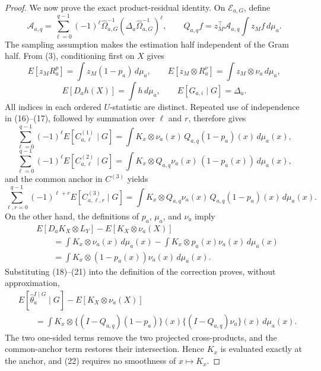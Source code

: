 \documentclass{article}
\begin{document}
\begin{proof}
We now prove the exact product-residual identity.  On \(\mathcal E_{a,G}\), define
\[
 \mathcal A_{a,q}
 =\sum_{\ell=0}^{q-1}(-1)^\ell
 \widehat\Omega_{a,G}^{-1}
 (\Delta_a\widehat\Omega_{a,G}^{-1})^\ell,
 \qquad
 Q_{a,q}f
 =z_M^\top\mathcal A_{a,q}\int z_Mf\,d\mu_a.
 \tag{15}
\]
The sampling assumption makes the estimation half independent of the Gram half.  From (3), conditioning first on \(X\) gives
\[
 E[z_MR_a^p]
 =\int z_M(1-p_a)\,d\mu_a,
 \qquad
 E[z_M\otimes R_a^\nu]
 =\int z_M\otimes\nu_a\,d\mu_a,
 \tag{16}
\]
\[
 E[D_ah(X)]=\int h\,d\mu_a,
 \qquad
 E[G_{a,i}\mid G]=\Delta_a.
 \tag{17}
\]
All indices in each ordered \(U\)-statistic are distinct.  Repeated use of independence in (16)--(17), followed by summation over \(\ell\) and \(r\), therefore gives
\[
 \sum_{\ell=0}^{q-1}(-1)^\ell
 E[C^{(1)}_{a,\ell}\mid G]
 =\int K_x\otimes\nu_a(x)\,
        Q_{a,q}(1-p_a)(x)\,d\mu_a(x),
 \tag{18}
\]
\[
 \sum_{\ell=0}^{q-1}(-1)^\ell
 E[C^{(2)}_{a,\ell}\mid G]
 =\int K_x\otimes Q_{a,q}\nu_a(x)\,
        (1-p_a(x))\,d\mu_a(x),
 \tag{19}
\]
and the common anchor in \(C^{(3)}\) yields
\[
 \sum_{\ell,r=0}^{q-1}(-1)^{\ell+r}
 E[C^{(3)}_{a,\ell,r}\mid G]
 =\int K_x\otimes Q_{a,q}\nu_a(x)\,
        Q_{a,q}(1-p_a)(x)\,d\mu_a(x).
 \tag{20}
\]
On the other hand, the definitions of \(p_a\), \(\mu_a\), and \(\nu_a\) imply
\[
 \begin{aligned}
 &E[D_aK_X\otimes L_Y]
   -E[K_X\otimes\nu_a(X)]\\
 &\qquad
 =\int K_x\otimes\nu_a(x)\,d\mu_a(x)
  -\int K_x\otimes p_a(x)\nu_a(x)\,d\mu_a(x)\\
 &\qquad
 =\int K_x\otimes(1-p_a(x))\nu_a(x)\,d\mu_a(x).
 \end{aligned}
 \tag{21}
\]
Substituting (18)--(21) into the definition of the correction proves, without approximation,
\[
 \begin{aligned}
 &E[\widehat\theta_a^{I\mid G}\mid G]
   -E[K_X\otimes\nu_a(X)]\\
 &\qquad
 =\int K_x\otimes
   \{(I-Q_{a,q})(1-p_a)\}(x)
   \{(I-Q_{a,q})\nu_a\}(x)\,d\mu_a(x).
 \end{aligned}
 \tag{22}
\]
The two one-sided terms remove the two projected cross-products, and the common-anchor term restores their intersection.  Hence \(K_x\) is evaluated exactly at the anchor, and (22) requires no smoothness of \(x\mapsto K_x\).


\end{proof}
\end{document}
